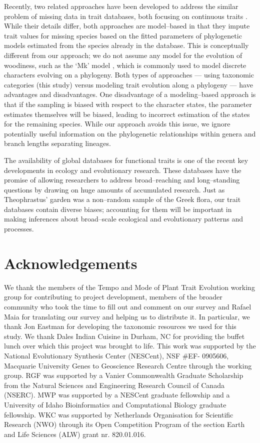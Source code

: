 \documentclass[a4paper,12pt]{article}
\begin{document}
Recently, two related approaches have been developed to address the
similar problem of missing data in trait databases, both focusing on
continuous traits \citep{Swenson2013, PEM}.  While their details
differ, both approaches are model--based in that they impute trait values
for missing species
based on the fitted parameters of phylogenetic models estimated from
the species already in the database. This is conceptually different
from our approach; we do not assume any model for the evolution of
woodiness, such as the `Mk' model \citep{Pagel1994}, which is commonly used
to model discrete characters evolving on a phylogeny. Both types of
approaches --- using taxonomic categories (this study) versus modeling
trait evolution along a phylogeny --- have advantages and
disadvantages.  One disadvantage of a modeling--based approach is that
if the sampling is biased with respect to the character states, the
parameter estimates themselves will be biased, leading to incorrect
estimation of the states for the remaining species. While our approach
avoids this issue, we ignore potentially useful information on the
phylogenetic relationships within genera and branch lengths separating lineages.

The availability of global databases for functional traits
is one of the recent key developments in ecology and evolutionary
research.  These databases have the promise of allowing researchers to
address broad--reaching and long--standing questions by drawing on
huge amounts of accumulated research.  Just as Theophrastus' garden
was a non--random sample of the Greek flora, our trait databases
contain diverse biases; accounting for them will be important in
making inferences about broad--scale ecological and evolutionary
patterns and processes.

\section{Acknowledgements}

We thank the members of the Tempo and Mode of Plant Trait
Evolution working group for contributing to project development,
members of the broader community who took the time to fill out and
comment on our survey and Rafael Maia for translating our survey and
helping us to distribute it.  In particular, we thank Jon Eastman for 
developing the taxonomic resources we used for this study.
%
We thank Dales Indian Cuisine in Durham, NC for providing the buffet
lunch over which this project was brought to life.
%
This work was supported by the National Evolutionary Synthesis Center
(NESCent), NSF \#EF- 0905606, Macquarie University Genes to Geoscience
Research Centre through the working group.
%
RGF was supported by a Vanier Commonwealth Graduate Scholarship from
the Natural Sciences and Engineering Research Council of Canada
(NSERC).
MWP was supported by a NESCent graduate fellowship and a 
University of Idaho Bioinformatics and Computational Biology graduate fellowship.
%
WKC was supported by Netherlands Organisation for
Scientific Research (NWO) through its Open Competition Program of the
section Earth and Life Sciences (ALW) grant nr. 820.01.016.
\end{document}
